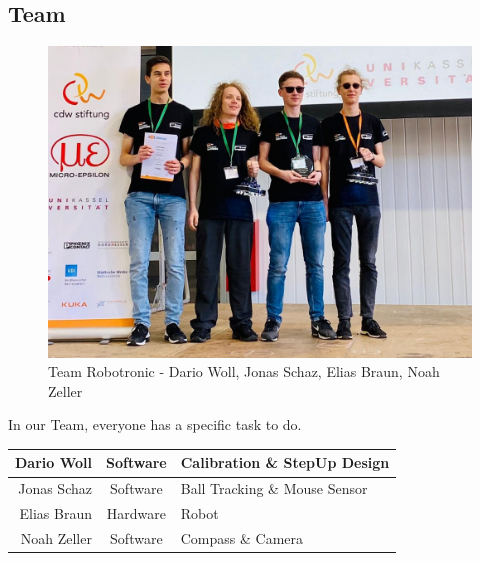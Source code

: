 \subsection{Team}
\begin{figure}[h]
    \centering
    \includegraphics[width=\textwidth]{img/Robotronic.jpg}
    \caption{Team Robotronic - Dario Woll, Jonas Schaz, Elias Braun, Noah Zeller}
    \label{fig:team}
\end{figure}
In our Team, everyone has a specific task to do.\\


\begin{tabular}[h]{r|c|l}
    Dario Woll&Software&Calibration \& StepUp Design\\\hline
    Jonas Schaz&Software&Ball Tracking \& Mouse Sensor\\\hline
    Elias Braun&Hardware&Robot\\\hline
    Noah Zeller&Software&Compass \& Camera
\end{tabular}
\newpage

